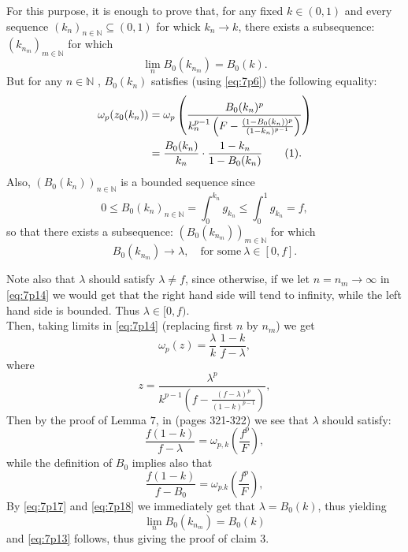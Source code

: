 \documentclass{article}
\numberwithin{equation}{section}
\theoremstyle{definition}
\theoremstyle{remark}
\newcommand\numberthis{\addtocounter{equation}{1}\tag{\theequation}}
\begin{document}
\noindent For this purpose, it is enough to prove that, for any fixed $k \in (0,1)$ and every sequence $(k_n)_{n \in \mathbb{N}} \subseteq (0,1)$ for whick $k_n \to k$, there exists a subsequence: $(k_{n_m})_{m \in \mathbb{N}}$ for which 
\begin{equation} \label{eq:7p13}
    \lim \limits_{n} B_0(k_{n_m}) = B_0(k) .
\end{equation}
%
But for any $n \in \mathbb{N}$ , $B_0(k_n)$ satisfies (using \eqref{eq:7p6}) the following equality:
\begin{align*}
    \omega_p(z_0(k_n)) &= \omega_p \left ( \frac{B_0(k_n)^p}{k_n^{p-1} \left ( F - \frac{(1 - B_0(k_n))^p}{(1-k_n)^{p-1}} \right )} \right ) \\
    &= \frac{B_0(k_n)}{k_n} \cdot \frac{1-k_n}{1-B_0(k_n)} \numberthis \label{eq:7p14} .
\end{align*}
%
Also, $(B_0(k_n))_{n \in \mathbb{N}}$ is a bounded sequence since
\[
0 \leq B_0(k_n)_{n \in \mathbb{N}} = \int_0^{k_n} g_{k_n} \leq \int_0^1 g_{k_n} = f ,
\]
so that there exists a subsequence: $(B_0(k_{n_m}))_{m \in \mathbb{N}}$ for which
\[
B_0(k_{n_m}) \to \lambda , \quad \text{for some} \ \lambda \in [0,f] .
\]

\noindent Note also that $\lambda$ should satisfy $\lambda \neq f$, since otherwise, if we let $n=n_m \to \infty$ in \eqref{eq:7p14} we would get that the right hand side will tend to infinity, while the left hand side is bounded. Thus $\lambda \in [0,f).$ \\

\noindent Then, taking limits in \eqref{eq:7p14} (replacing first $n$ by $n_m$) we get
%
\begin{equation} \label{eq:7p15}
    \omega_p(z) = \frac{\lambda}{k} \ \frac{1-k}{f-\lambda} ,
\end{equation}
%
where
\begin{equation} \label{eq:7p16}
    z = \frac{\lambda^p}{k^{p-1} \left ( f - \frac{(f-\lambda)^p}{(1-k)^{p-1}}\right )} , 
\end{equation}
%
Then by the proof of Lemma $7$, in \cite{M} (pages 321-322) we see that $\lambda$ should satisfy:
%
\begin{equation} \label{eq:7p17}
    \frac{f(1-k)}{f-\lambda} = \omega_{p,k} \left ( \frac{f^p}{F} \right ) ,
\end{equation}
%
while the definition of $B_0$ implies also that
%
\begin{equation} \label{eq:7p18}
    \frac{f(1-k)}{f-B_0} = \omega_{p.k} \left ( \frac{f^p}{F} \right ) ,
\end{equation}
%
By \eqref{eq:7p17} and \eqref{eq:7p18} we immediately get that $\lambda = B_0(k)$, thus yielding $$\lim \limits_{n} B_0(k_{n_m})=B_0(k)$$ and \eqref{eq:7p13} follows, thus giving the proof of claim 3. \\
\end{document}

